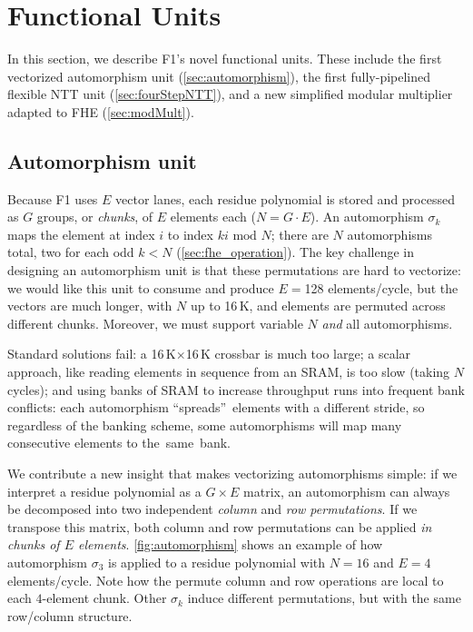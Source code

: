 \section{Functional Units}
\label{sec:FUs}

In this section, we describe F1's novel functional units.
These include the first vectorized automorphism unit (\autoref{sec:automorphism}),
the first fully-pipelined flexible NTT unit (\autoref{sec:fourStepNTT}),
and a new simplified modular multiplier adapted to FHE (\autoref{sec:modMult}).

\subsection{Automorphism unit}\label{sec:automorphism}

\figAutomorphism

Because F1 uses $E$ vector lanes, each residue polynomial
is stored and processed as $G$ groups, or \emph{chunks}, of $E$ elements each ($N=G\cdot E$).
An automorphism $\sigma_k$ maps the element at index $i$ to index $ki \textrm{ mod } N$;
there are $N$ automorphisms total, two for each odd $k < N$ (\autoref{sec:fhe_operation}).
The key challenge in designing an automorphism unit is that these permutations are hard to vectorize:
we would like this unit to consume and produce $E=$128 elements/cycle, but the vectors
are much longer, with $N$ up to 16\,K, and elements are permuted across different chunks.
Moreover, we must support variable $N$ \emph{and} all automorphisms.

Standard solutions fail: a 16\,K$\times$16\,K crossbar is much too large;
a scalar approach, like reading elements in sequence from an SRAM, is too slow (taking $N$ cycles);
and using banks of SRAM to increase throughput runs into frequent bank conflicts:
each automorphism ``spreads''~elements with a different stride, so regardless of the banking scheme,
some automorphisms will map many consecutive elements to the~same~bank.

We contribute a new insight that makes vectorizing automorphisms simple:
if we interpret a residue polynomial as a $G \times E$ matrix,
an automorphism can always be decomposed into two independent \emph{column} and \emph{row permutations}.
If we transpose this matrix, both column and row permutations can 
be applied \emph{in chunks of $E$ elements}. \autoref{fig:automorphism} shows an example 
of how automorphism $\sigma_3$ is applied to a residue polynomial
with $N=16$ and $E=4$ elements/cycle.
Note how the permute column and row operations are local to each $4$-element chunk.
Other $\sigma_k$ induce different permutations, but with the same row/column structure.

